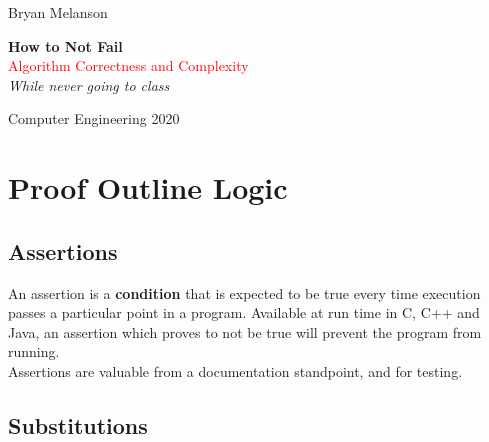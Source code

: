 \documentclass[11pt]{article}
\newcommand*{\plogo}{\fbox{$\mathcal{BM}$}}
\begin{document}
 
        
    \begin{titlepage}
    
        \raggedleft
        
        \vspace*{\baselineskip}
        
        {\Large Bryan Melanson}
        
        \vspace*{0.167\textheight}
        
        \textbf{\LARGE How to Not Fail}\\[\baselineskip]
        
        {\textcolor{Red}{\Huge Algorithm Correctness and Complexity}}\\[\baselineskip]
        
        {\Large \textit{While never going to class}}
        
        \vfill
        
        {\large Computer Engineering 2020 ~~\plogo}
        
        \vspace*{3\baselineskip}
    
    \end{titlepage}

    \pagebreak
    
    
    \tableofcontents

\section{Proof Outline Logic}

\subsection{Assertions}
An assertion is a \textbf{condition} that is expected to be true every time execution passes a particular point in a program. Available at run time in C, C++ and Java, an assertion which proves to not be true will prevent the program from running. \\

Assertions are valuable from a documentation standpoint, and for testing.

\subsection{Substitutions}
\end{document}
